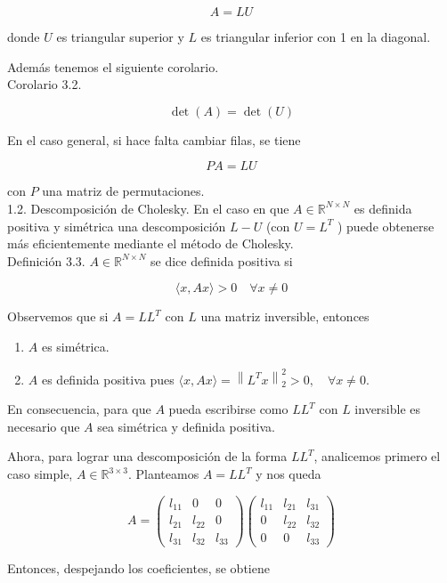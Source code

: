 \documentclass[10pt]{book}
\begin{document}
$$
A=L U
$$

donde $U$ es triangular superior y $L$ es triangular inferior con 1 en la diagonal.

Además tenemos el siguiente corolario.\\
Corolario 3.2.

$$
\operatorname{det}(A)=\operatorname{det}(U)
$$

En el caso general, si hace falta cambiar filas, se tiene

$$
P A=L U
$$

con $P$ una matriz de permutaciones.\\
1.2. Descomposición de Cholesky. En el caso en que $A \in \mathbb{R}^{N \times N}$ es definida positiva y simétrica una descomposición $L-U$ (con $U=L^{T}$ ) puede obtenerse más eficientemente mediante el método de Cholesky.\\
Definición 3.3. $A \in \mathbb{R}^{N \times N}$ se dice definida positiva si

$$
\langle x, A x\rangle>0 \quad \forall x \neq 0
$$

Observemos que si $A=L L^{T}$ con $L$ una matriz inversible, entonces

\begin{enumerate}
  \item $A$ es simétrica.
  \item $A$ es definida positiva pues $\langle x, A x\rangle=\left\|L^{T} x\right\|_{2}^{2}>0, \quad \forall x \neq 0$.
\end{enumerate}

En consecuencia, para que $A$ pueda escribirse como $L L^{T}$ con $L$ inversible es necesario que $A$ sea simétrica y definida positiva.

Ahora, para lograr una descomposición de la forma $L L^{T}$, analicemos primero el caso simple, $A \in \mathbb{R}^{3 \times 3}$. Planteamos $A=L L^{T}$ y nos queda

$$
A=\left(\begin{array}{ccc}
l_{11} & 0 & 0 \\
l_{21} & l_{22} & 0 \\
l_{31} & l_{32} & l_{33}
\end{array}\right)\left(\begin{array}{ccc}
l_{11} & l_{21} & l_{31} \\
0 & l_{22} & l_{32} \\
0 & 0 & l_{33}
\end{array}\right)
$$

Entonces, despejando los coeficientes, se obtiene
\end{document}
